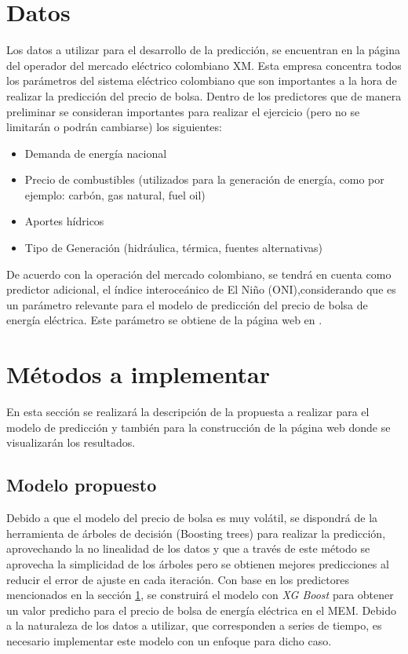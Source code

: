 \documentclass[conference, 10pt]{IEEEtran}
\begin{document}
\section{Datos} \label{sec:data}
Los datos a utilizar para el desarrollo de la predicción, se encuentran en la página del operador del mercado eléctrico colombiano XM. Esta empresa concentra todos los parámetros del sistema eléctrico colombiano que son importantes a la hora de realizar la predicción del precio de bolsa. Dentro de los predictores que de manera preliminar se consideran importantes para realizar el ejercicio (pero no se limitarán o podrán cambiarse) los siguientes:
\begin{itemize}
\item Demanda de energía nacional 
\item Precio de combustibles (utilizados para la generación de energía, como por ejemplo: carbón, gas natural, fuel oil)
\item Aportes hídricos 
\item Tipo de Generación (hidráulica, térmica, fuentes alternativas) 

\end{itemize}
De acuerdo con la operación del mercado colombiano, se tendrá en cuenta como predictor adicional, el índice interoceánico de El Niño (ONI),considerando que es un parámetro relevante para el modelo de predicción del precio de bolsa de energía eléctrica. Este parámetro se obtiene de la página web en \cite{b3}. 

\section{Métodos a implementar} \label{sec:meth}
En esta sección se realizará la descripción de la propuesta a realizar para el modelo de predicción y también para la construcción de la página web donde se visualizarán los resultados.
\subsection{Modelo propuesto} \label{sec:prop}

Debido a que el modelo del precio de bolsa es muy volátil, se dispondrá de la herramienta de árboles de decisión (Boosting trees) para realizar la predicción, aprovechando la no linealidad de los datos y que a través de este método se aprovecha la simplicidad de los árboles pero se obtienen mejores predicciones al reducir el error de ajuste en cada iteración. Con base en los predictores mencionados en la sección \ref{sec:data}, se construirá el modelo con \textit{XG Boost}  para obtener un valor predicho para el precio de bolsa de energía eléctrica en el MEM. Debido a la naturaleza de los datos a utilizar, que corresponden a series de tiempo, es necesario implementar este modelo con un enfoque para dicho caso. \ 
\end{document}
